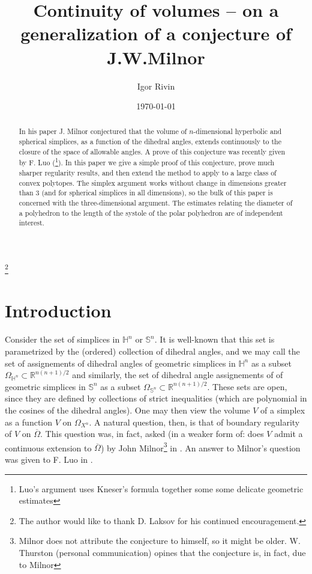 \documentclass[12pt]{amsart}
\theoremstyle{remark}
\begin{document}
\title[Continuity of volumes]{Continuity of volumes -- on a generalization of a conjecture of J.W.Milnor}
\author{Igor Rivin}
\begin{abstract}
In his paper \cite{milnorcol} J. Milnor conjectured that the volume of
$n$-dimensional hyperbolic and spherical simplices, as a function of the
dihedral angles, extends continuously to the closure of the space of
allowable angles. A prove of this conjecture was recently given by F. Luo
(\cite{luovol}\footnote{Luo's argument uses Kneser's formula \cite{kneser36}
  together some some delicate geometric estimates}). 
In this paper we give a simple proof of this conjecture, prove much sharper
regularity results, and then extend the method to apply to a large class of
convex polytopes. The simplex argument works without change in dimensions
greater than $3$ (and for spherical simplices in all dimensions), so the bulk
of this paper is concerned with the three-dimensional argument. The estimates
relating the diameter of a polyhedron to the length of the systole of the
polar polyhedron are of independent interest.\end{abstract} 
\thanks{The author would like to thank D. Laksov for his continued encouragement.}

\date{\today}

\maketitle
\section{Introduction}
Consider the set of simplices in $\mathbb{H}^n$ or $\mathbb{S}^n.$ It is
well-known that this set is parametrized by the (ordered) collection of
dihedral angles, and we may call the set of assignements of dihedral angles of
geometric simplices in $\mathbb{H}^n$ as a subset $\Omega_{\mathbb{H}^n}
\subset \mathbb{R}^{n(n+1)/2 }$ and similarly, the set of dihedral angle
assignements of of geometric simplices in $\mathbb{S}^n$ as a subset
$\Omega_{\mathbb{S}^n} \subset \mathbb{R}^{n(n+1)/2}.$  These sets are open,
since they are defined by collections of strict inequalities (which are
polynomial in the cosines of the dihedral angles).  One may then view the
volume $V$ of a simplex as a function $V$ on $\Omega_{X^n}.$ A natural
question, then, is that of boundary regularity of $V$ on $\overline{\Omega}.$ 
This question was, in fact, asked (in a weaker form of: does $V$ admit a
continuous extension to $\overline{\Omega}$) by John Milnor\footnote{Milnor
  does not attribute the conjecture to himself, so it might be
  older. W. Thurston (personal communication) opines that the conjecture is,
  in fact, due to Milnor}  in \cite{milnorcol}.  An answer to Milnor's
question was given to F. Luo in \cite{luovol}.
\end{document}
